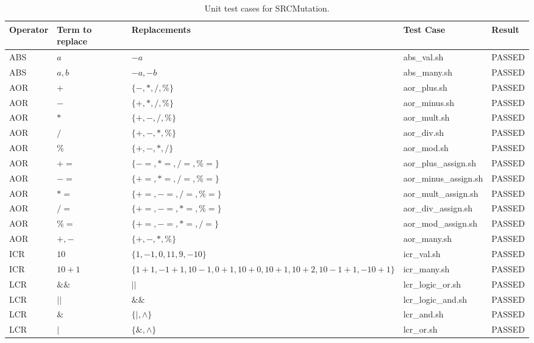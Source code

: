 
\setlength\LTleft{0pt}
\setlength\LTright{0pt}
\scriptsize

\begin{longtable}{|p{1cm}|p{3cm}|p{5.5cm}|p{2.5cm}|p{1.5cm}|}

\caption{Unit test cases for SRCMutation.}
\label{table:matrix} \\

\hline
\textbf{Operator}	&	\textbf{Term to replace}	&	\textbf{Replacements}	&	\textbf{Test Case} &\textbf{Result}\\
\hline
ABS	&	$a$	&	$-a$	&	abs\_val.sh  & PASSED\\
ABS	&	$a,b$	&	$-a,-b$	&	abs\_many.sh  & PASSED\\
AOR	&	$+$	&	$\{-,*,/,\%\}$	&	aor\_plus.sh  & PASSED\\
AOR	&	$-$	&	$\{+,*,/,\%\}$	&	aor\_minus.sh  & PASSED\\
AOR	&	$*$	&	$\{+,-,/,\%\}$	&	aor\_mult.sh  & PASSED\\
AOR	&	$/$	&	$\{+,-,*,\%\}$	&	aor\_div.sh  & PASSED\\
AOR	&	$\%$	&	$\{+,-,*,/\}$	&	aor\_mod.sh  & PASSED\\
AOR	&	$+=$	&	$\{-=,*=,/=,\%=\}$	&	aor\_plus\_assign.sh  & PASSED\\
AOR	&	$-=$	&	$\{+=,*=,/=,\%=\}$	&	aor\_minus\_assign.sh  & PASSED\\
AOR	&	$*=$	&	$\{+=,-=,/=,\%=\}$	&	aor\_mult\_assign.sh  & PASSED\\
AOR	&	$/=$	&	$\{+=,-=,*=,\%=\}$	&	aor\_div\_assign.sh  & PASSED\\
AOR	&	$\%=$	&	$\{+=,-=,*=,/=\}$	&	aor\_mod\_assign.sh  & PASSED\\
AOR	&	$+,-$	&	$\{+,-,*,\%\}$	&	aor\_many.sh  & PASSED\\
ICR	&	$10$	&	$\{1, -1, 0, 11, 9, -10\}$	&	icr\_val.sh  & PASSED\\
ICR	&	$10 + 1$	&	$\{1+1, -1+1, 10-1, 0+1, 10+0, 10+1, 10+2, 10-1+1, -10+1\}$	&	icr\_many.sh  & PASSED\\
LCR	&	$\&\&$	&	$||$	&	lcr\_logic\_or.sh  & PASSED\\
LCR	&	$||$	&	$\&\&$	&	lcr\_logic\_and.sh  & PASSED\\
LCR	&	$\&$	&	$\{|,\land\}$	&	lcr\_and.sh  & PASSED\\
LCR	&	$|$	&	$\{\&,\land\}$	&	lcr\_or.sh  & PASSED\\

\end{longtable}
